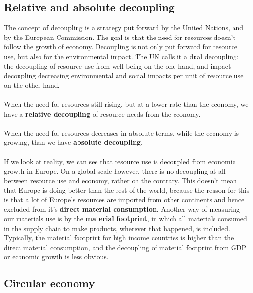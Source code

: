 \documentclass[../summary.tex]{subfiles}
\begin{document}
	\subsection{Relative and absolute decoupling}
	
	The concept of decoupling is a strategy put forward by the United Nations, and by the European Commission. The goal is that the need for resources doesn’t follow the growth of economy. Decoupling is not only put forward for resource use, but also for the environmental impact. The UN calls it a dual decoupling: the decoupling of resource use from well-being on the one hand, and impact decoupling decreasing environmental and social impacts per unit of resource use on the other hand.
	\\\\
	When the need for resources still rising, but at a lower rate than the economy, we have a \textbf{relative decoupling} of resource needs from the economy.
	\\\\
	When the need for resources decreases in absolute terms, while the economy is growing, than we have \textbf{absolute decoupling}.
	\\\\
	If we look at reality, we can see that resource use is decoupled from economic growth in Europe. On a global scale however, there is no decoupling at all between resource use and economy, rather on the contrary. This doesn't mean that Europe is doing better than the rest of the world, because the reason for this is that a lot of Europe's resources are imported from other continents and hence excluded from it's \textbf{direct material consumption}. Another way of measuring our materials use is by the \textbf{material footprint}, in which all materials consumed in the supply chain to make products, wherever that happened, is included. Typically, the material footprint for high income countries is higher than the direct material consumption, and the decoupling of material footprint from GDP or economic growth is less obvious.
	
	\subsection{Circular economy}
	
\end{document}
